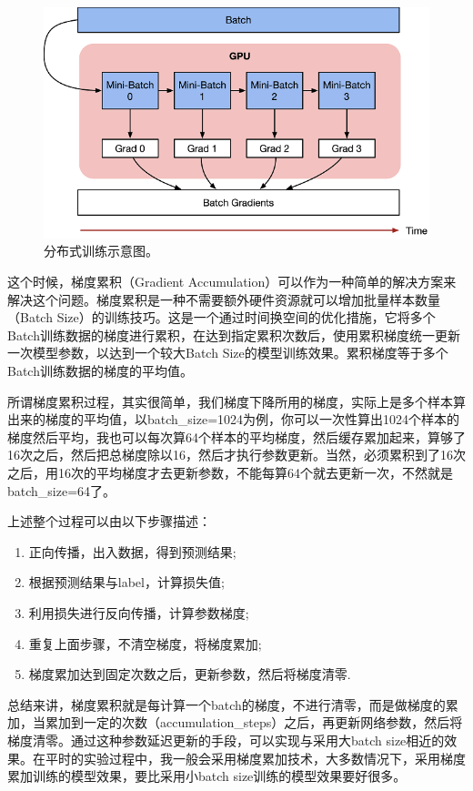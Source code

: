 \documentclass[a4paper]{zreport}
\begin{document}
\begin{figure}[t]
\centering
\includegraphics[width=0.9\linewidth]{figures/grad}
\caption{分布式训练示意图。}
\label{fig:grad}
\end{figure}


这个时候，梯度累积（Gradient Accumulation）可以作为一种简单的解决方案来解决这个问题。梯度累积是一种不需要额外硬件资源就可以增加批量样本数量（Batch Size）的训练技巧。这是一个通过时间换空间的优化措施，它将多个Batch训练数据的梯度进行累积，在达到指定累积次数后，使用累积梯度统一更新一次模型参数，以达到一个较大Batch Size的模型训练效果。累积梯度等于多个Batch训练数据的梯度的平均值。

所谓梯度累积过程，其实很简单，我们梯度下降所用的梯度，实际上是多个样本算出来的梯度的平均值，以batch\_size=1024为例，你可以一次性算出1024个样本的梯度然后平均，我也可以每次算64个样本的平均梯度，然后缓存累加起来，算够了16次之后，然后把总梯度除以16，然后才执行参数更新。当然，必须累积到了16次之后，用16次的平均梯度才去更新参数，不能每算64个就去更新一次，不然就是batch\_size=64了。

上述整个过程可以由以下步骤描述：

\medskip
\begin{enumerate}
\item 正向传播，出入数据，得到预测结果;
\item 根据预测结果与label，计算损失值;
\item 利用损失进行反向传播，计算参数梯度;
\item 重复上面步骤，不清空梯度，将梯度累加;
\item 梯度累加达到固定次数之后，更新参数，然后将梯度清零.
\end{enumerate}
\medskip

总结来讲，梯度累积就是每计算一个batch的梯度，不进行清零，而是做梯度的累加，当累加到一定的次数（accumulation\_steps）之后，再更新网络参数，然后将梯度清零。通过这种参数延迟更新的手段，可以实现与采用大batch size相近的效果。在平时的实验过程中，我一般会采用梯度累加技术，大多数情况下，采用梯度累加训练的模型效果，要比采用小batch size训练的模型效果要好很多。
\end{document}
